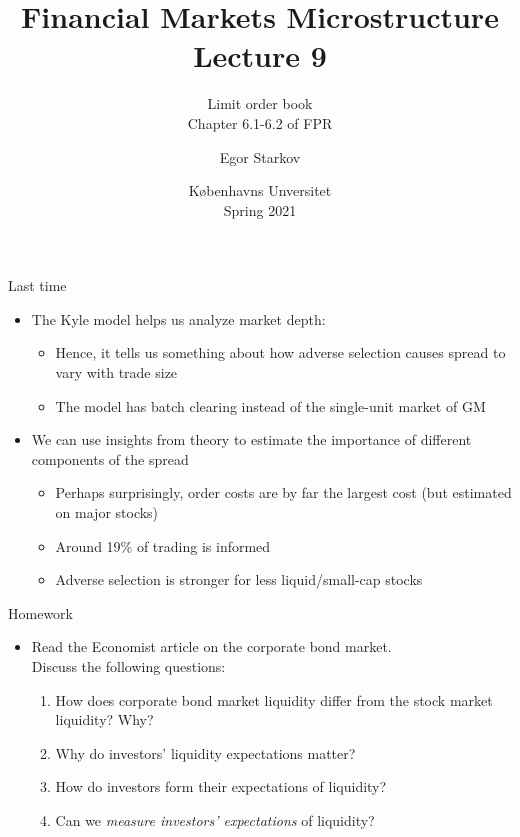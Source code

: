 \documentclass[english,10pt
,aspectratio=169
]{beamer}
\title{Financial Markets Microstructure \\ Lecture 9}
\subtitle{Limit order book\\
	Chapter 6.1-6.2 of FPR}
\author{Egor Starkov}
\date{K{\o}benhavns Unversitet \\
	Spring 2021}
\begin{document}
\frame[plain]{\titlepage}


\begin{frame}{Last time}
	\begin{itemize}
		\item The Kyle model helps us analyze market depth:
		\begin{itemize}
			\item Hence, it tells us something about how adverse selection causes spread to vary with trade size
			\item The model has batch clearing instead of the single-unit market of GM
		\end{itemize}
		\item We can use insights from theory to estimate the importance of different components of the spread
		\begin{itemize}
			\item Perhaps surprisingly, order costs are by far the largest cost (but estimated on major stocks)
			\item Around 19\% of trading is informed
			\item Adverse selection is stronger for less liquid/small-cap stocks
		\end{itemize}
	\end{itemize}
\end{frame}


\begin{frame}{Homework}
	\begin{itemize}
		\item Read the Economist article on the corporate bond market. 
		\\
		Discuss the following questions:
		\begin{enumerate}
			\item How does corporate bond market liquidity differ from the stock market liquidity? Why?
			\item Why do investors' liquidity expectations matter?
			\item How do investors form their expectations of liquidity?
			\item Can we \emph{measure investors' expectations} of liquidity?
		\end{enumerate}
	\end{itemize}
\end{frame}
\end{document}
